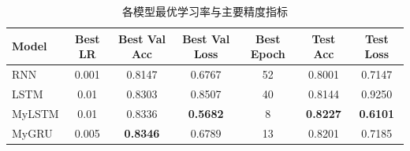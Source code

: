 \begin{table}[htbp]
\centering
\caption{各模型最优学习率与主要精度指标}
\begin{tabular}{lcccccc}
\toprule
Model & Best LR & Best Val Acc & Best Val Loss & Best Epoch & Test Acc & Test Loss \\
\midrule
RNN & 0.001 & 0.8147 & 0.6767 & 52 & 0.8001 & 0.7147 \\
LSTM & 0.01 & 0.8303 & 0.8507 & 40 & 0.8144 & 0.9250 \\
MyLSTM & 0.01 & 0.8336 & \textbf{0.5682} & 8 & \textbf{0.8227} & \textbf{0.6101} \\
MyGRU & 0.005 & \textbf{0.8346} & 0.6789 & 13 & 0.8201 & 0.7185 \\
\bottomrule
\end{tabular}
\label{tab:best_model_summary}
\end{table}
